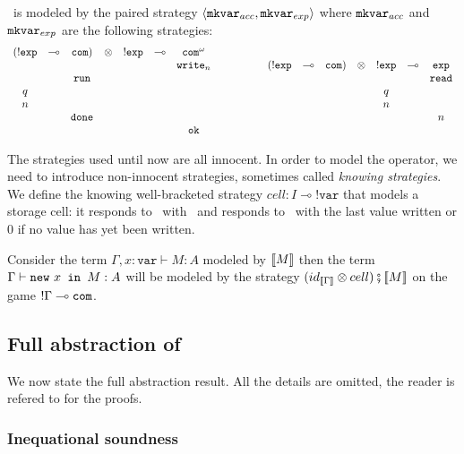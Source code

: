 \iamkvar\ is modeled by the paired strategy $\langle \texttt{mkvar}_{acc} , \texttt{mkvar}_{exp}
\rangle$ where $\texttt{mkvar}_{acc}$ and $\texttt{mkvar}_{exp}$ are the following strategies:
$$
\begin{array}{ccccccc}
(\mathtt{!exp} & \multimap & \mathtt{com}) & \otimes & !\mathtt{exp} & \multimap & \mathtt{com}^\omega\\
&&&&&&\texttt{write}_n\\
&&\texttt{run}\\
q\\
n\\
&&\texttt{done} \\
&&&&&&\texttt{ok}
\end{array}
\hspace{1.5cm}
\begin{array}{ccccccc}
(\mathtt{!exp} & \multimap & \mathtt{com}) & \otimes & !\mathtt{exp} & \multimap & \mathtt{exp}\\
&&&&&&\texttt{read}\\
&&&&q\\
&&&&n\\
&&&&&&n
\end{array}
$$


The strategies used until now are all innocent. In order to model the \ianew operator, we need to introduce non-innocent strategies, sometimes called
\emph{knowing strategies}. We define the knowing well-bracketed strategy $cell : I \multimap !\mathtt{var}$ that models a storage cell: it responds to \iawrite\
with \iaok\ and responds
to \iaread\ with the last value written or $0$ if no value has yet been written.

Consider the term $\Gamma,x:\mathtt{var} \vdash M : A$ modeled by ${[\![ M ]\!]}$ then the term
 $\Gamma \vdash \texttt{new}\ x \texttt{ in } M : A$  will be modeled by the strategy $(id_{{[\![ \Gamma ]\!]}} \otimes cell) \fatsemi {[\![M ]\!]}$ on the game
 $!\Gamma \multimap \texttt{com}$.

\subsection{Full abstraction of \ialgol}

We now state the full abstraction result. All the details are omitted, the reader is refered
to \cite{abramsky:game-semantics-tutorial,AM97a} for the proofs.

\subsubsection{Inequational soundness}

